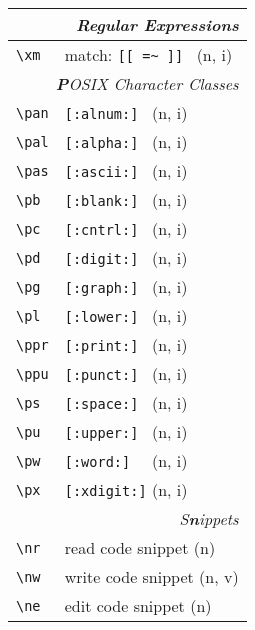 \documentclass[oneside,12pt,a4paper,DIV18]{scrartcl}
\begin{document}
\begin{center}
\newpage 
\begin{tabular}[]{|p{11mm}|p{59mm}|}
\hline
\multicolumn{2}{|r|}{\textsl{Regular E\textbf{x}pressions}}\\
\hline \verb'\xm' & match: \verb'[[ =~ ]] '         \hfill (n, i)\\
\hline
\hline
\multicolumn{2}{|r|}{\textsl{\textbf{P}OSIX Character Classes}}\\
\hline \verb'\pan' &  \verb'[:alnum:] '         \hfill (n, i)\\
\hline \verb'\pal' &  \verb'[:alpha:] '         \hfill (n, i)\\
\hline \verb'\pas' &  \verb'[:ascii:] '         \hfill (n, i)\\
\hline \verb'\pb'  &  \verb'[:blank:] '         \hfill (n, i)\\
\hline \verb'\pc'  &  \verb'[:cntrl:] '         \hfill (n, i)\\
\hline \verb'\pd'  &  \verb'[:digit:] '         \hfill (n, i)\\
\hline \verb'\pg'  &  \verb'[:graph:] '         \hfill (n, i)\\
\hline \verb'\pl'  &  \verb'[:lower:] '         \hfill (n, i)\\
\hline \verb'\ppr' &  \verb'[:print:] '         \hfill (n, i)\\
\hline \verb'\ppu' &  \verb'[:punct:] '         \hfill (n, i)\\
\hline \verb'\ps'  &  \verb'[:space:] '         \hfill (n, i)\\
\hline \verb'\pu'  &  \verb'[:upper:] '         \hfill (n, i)\\
\hline \verb'\pw'  &  \verb'[:word:]  '         \hfill (n, i)\\
\hline \verb'\px'  &  \verb'[:xdigit:]'         \hfill (n, i)\\
\hline
\hline
\multicolumn{2}{|r|}{\textsl{S\textbf{n}ippets}}\\
\hline \verb'\nr'  & read code snippet          \hfill (n)\\
\hline \verb'\nw'  & write code snippet         \hfill (n, v)\\
\hline \verb'\ne'  & edit code snippet          \hfill (n)\\

\end{tabular}
\end{center}
\end{document}
